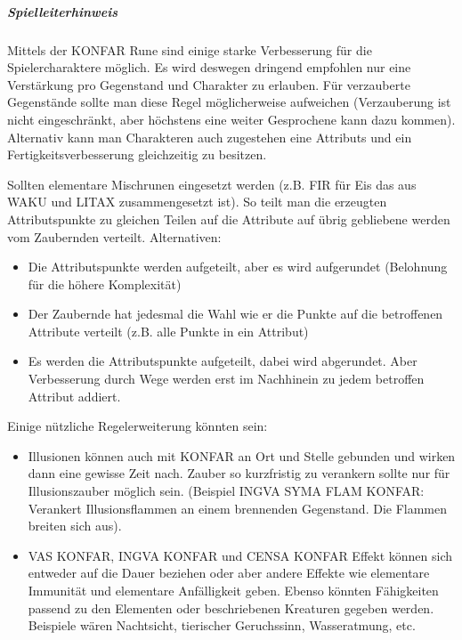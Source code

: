 \documentclass{article}
\begin{document}
\begin{mdframed}[hidealllines=true, backgroundcolor=black!10]
\subparagraph{Spielleiterhinweis}

Mittels der KONFAR Rune sind einige starke Verbesserung für die Spielercharaktere möglich. Es wird deswegen dringend
empfohlen nur eine Verstärkung pro Gegenstand und Charakter zu erlauben. Für verzauberte Gegenstände sollte man diese
Regel möglicherweise aufweichen (Verzauberung ist nicht eingeschränkt, aber höchstens eine weiter Gesprochene kann
dazu kommen). Alternativ kann man Charakteren auch zugestehen eine Attributs und ein Fertigkeitsverbesserung
gleichzeitig zu besitzen. 

Sollten elementare Mischrunen eingesetzt werden (z.B. FIR für Eis das aus WAKU und LITAX zusammengesetzt ist). So
teilt man die erzeugten Attributspunkte zu gleichen Teilen auf die Attribute auf übrig gebliebene werden vom Zaubernden
verteilt. Alternativen:

\begin{itemize}
\item Die Attributspunkte werden aufgeteilt, aber es wird aufgerundet (Belohnung für die höhere Komplexität)
\item Der Zaubernde hat jedesmal die Wahl wie er die Punkte auf die betroffenen Attribute verteilt (z.B. alle Punkte in ein Attribut)
\item Es werden die Attributspunkte aufgeteilt, dabei wird abgerundet. Aber Verbesserung durch Wege werden erst im Nachhinein zu jedem betroffen Attribut addiert.
\end{itemize}

Einige nützliche Regelerweiterung könnten sein:

\begin{itemize}
\item Illusionen können auch mit KONFAR an Ort und Stelle gebunden und wirken dann eine gewisse Zeit nach. Zauber so kurzfristig zu verankern sollte nur für Illusionszauber möglich sein. (Beispiel INGVA SYMA FLAM KONFAR: Verankert Illusionsflammen an einem brennenden Gegenstand. Die Flammen breiten sich aus).
\item VAS KONFAR, INGVA KONFAR und CENSA KONFAR Effekt können sich entweder auf die Dauer beziehen oder aber andere Effekte wie elementare Immunität und elementare Anfälligkeit geben. Ebenso könnten Fähigkeiten passend zu den Elementen oder beschriebenen Kreaturen gegeben werden. Beispiele wären Nachtsicht, tierischer Geruchssinn, Wasseratmung, etc.
\end{itemize}

\end{mdframed}
\end{document}
